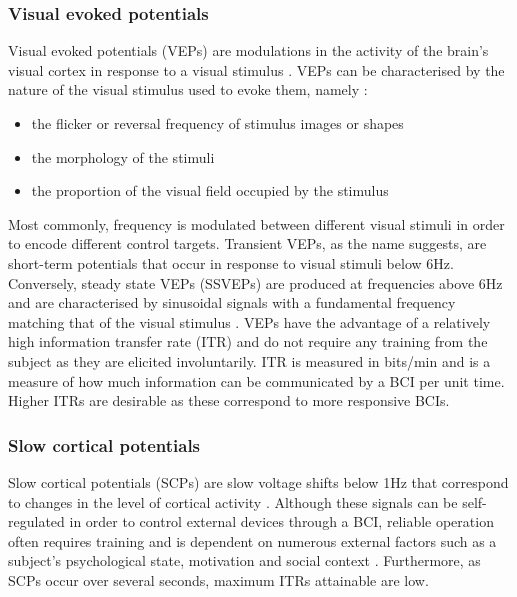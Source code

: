 \subsubsection{Visual evoked potentials}
Visual evoked potentials (VEPs) are modulations in the activity of the brain's visual cortex in response to a visual stimulus \cite{bromm-veps}. VEPs can be characterised by the nature of the visual stimulus used to evoke them, namely \cite{bci-survey-nicolas-alonso}: 
\begin{itemize}
    \item the flicker or reversal frequency of stimulus images or shapes
    \item the morphology of the stimuli
    \item the proportion of the visual field occupied by the stimulus
\end{itemize}
Most commonly, frequency is modulated between different visual stimuli in order to encode different control targets. Transient VEPs, as the name suggests, are short-term potentials that occur in response to visual stimuli below 6Hz. Conversely, steady state VEPs (SSVEPs) are produced at frequencies above 6Hz and are characterised by sinusoidal signals with a fundamental frequency matching that of the visual stimulus \cite{Xie2016}. VEPs have the advantage of a relatively high information transfer rate (ITR) and do not require any training from the subject as they are elicited involuntarily. ITR is measured in bits/min and is a measure of how much information can be communicated by a BCI per unit time. Higher ITRs are desirable as these correspond to more responsive BCIs.

\subsubsection{Slow cortical potentials}
Slow cortical potentials (SCPs) are slow voltage shifts below 1Hz that correspond to changes in the level of cortical activity \cite{bci-survey-nicolas-alonso}. Although these signals can be self-regulated in order to control external devices through a BCI, reliable operation often requires training and is dependent on numerous external factors such as a subject's psychological state, motivation and social context \cite{bci-survey-nicolas-alonso}. Furthermore, as SCPs occur over several seconds, maximum ITRs attainable are low.

